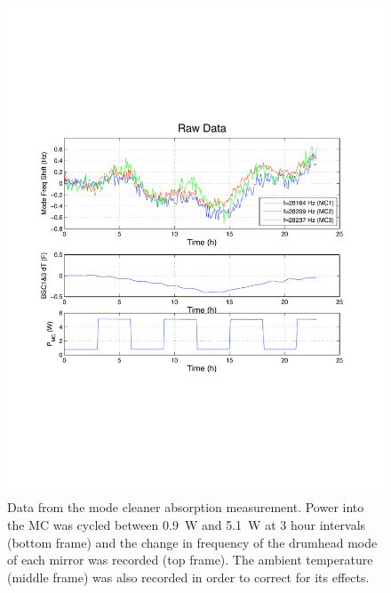\begin{figure}
\begin{centering}
\includegraphics[width=1.0\columnwidth]{figures/MCdrumheadFeb08_raw.pdf}
\caption[Data from the mode cleaner absorption measurement]{Data from
  the mode cleaner absorption measurement. Power into the MC was
  cycled between 0.9~W and 5.1~W at 3 hour intervals (bottom frame)
  and the change in frequency of the drumhead mode of each mirror was
  recorded (top frame). The ambient temperature (middle frame) was
  also recorded in order to correct for its effects.}
\label{fig:MCabsorption}
\end{centering}
\end{figure}


